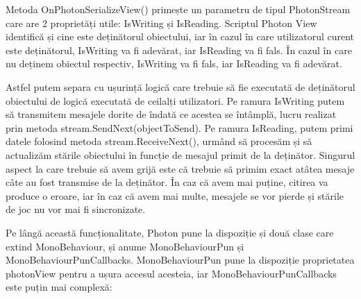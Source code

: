 \documentclass[12pt, a4paper]{article}
\begin{document}
	Metoda OnPhotonSerializeView() primește un parametru de tipul PhotonStream care are 2 proprietăți utile: IsWriting și IsReading. Scriptul Photon View identifică și cine este deținătorul obiectului, iar în cazul în care utilizatorul curent este deținătorul, IsWriting va fi adevărat, iar IsReading va fi fals. În cazul în care nu deținem obiectul respectiv, IsWriting va fi fals, iar IsReading va fi adevărat.
	\newline
	
	Astfel putem separa cu ușurință logică care trebuie să fie executată de deținătorul obiectului de logică executată de ceilalți utilizatori. Pe ramura IsWriting putem să transmitem mesajele dorite de îndată ce acestea se întâmplă, lucru realizat prin metoda stream.SendNext(objectToSend). Pe ramura IsReading, putem primi datele folosind metoda stream.ReceiveNext(), urmând să procesăm și să actualizăm stările obiectului în funcție de mesajul primit de la deținător. Singurul aspect la care trebuie să avem grijă este că trebuie să primim exact atâtea mesaje câte au fost transmise de la deținător. În caz că avem mai puține, citirea va produce o eroare, iar în caz că avem mai multe, mesajele se vor pierde și stările de joc nu vor mai fi sincronizate.
	\newline
	
	
	Pe lângă această funcționalitate, Photon pune la dispoziție și două clase care extind MonoBehaviour, și anume MonoBehaviourPun și MonoBehaviourPunCallbacks. MonoBehaviourPun pune la dispoziție proprietatea photonView pentru a ușura accesul acesteia, iar MonoBehaviourPunCallbacks este puțin mai complexă:
	
\end{document}
